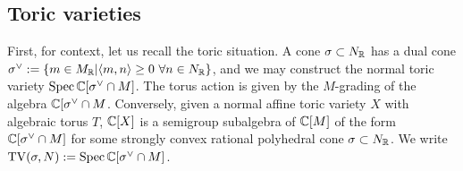 \subsection{Toric varieties}
First, for context, let us recall the toric situation. A cone \(\sigma \subset N_{\mathbb{R}}\) has a dual cone \(\sigma^\vee := \{m \in M_{\mathbb{R}} | \langle m, n \rangle \ge 0 \ \forall n \in N_{\mathbb{R}}\}\), and we may construct the normal toric variety \(\operatorname{Spec} \mathbb{C}[\sigma^\vee \cap M]\). The torus action is given by the \(M\)-grading of the algebra \(\mathbb{C}[\sigma^\vee \cap M\).  Conversely, given a normal affine toric variety \(X\) with algebraic torus \(T\), \(\mathbb{C}[X]\) is a semigroup subalgebra of \(\mathbb{C}[M]\) of the form \(\mathbb{C}[\sigma^\vee \cap M]\) for some strongly convex rational polyhedral cone \(\sigma \subset N_{\mathbb{R}}\). We write \(\operatorname{TV}(\sigma,N):= \operatorname{Spec} \mathbb{C}[\sigma^\vee \cap M] \).

